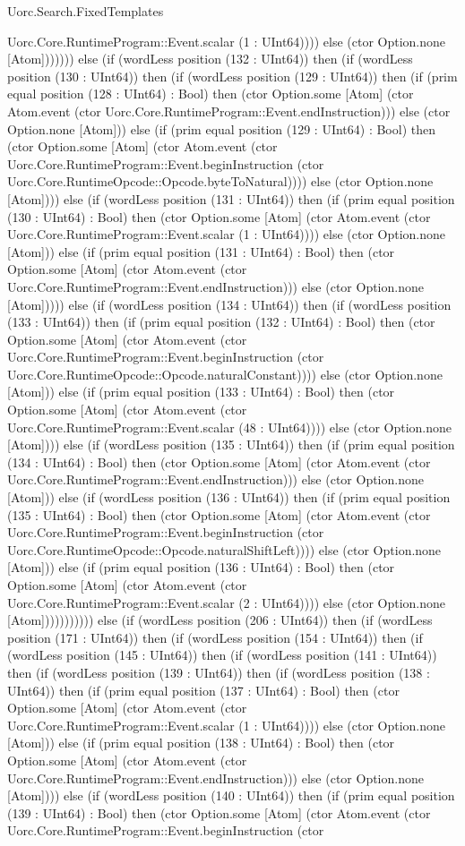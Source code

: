 \begin{lexlean}{Uorc.Search.FixedTemplates}
\begin{semanticmodule}
{Uorc.Core.RuntimeProgram::Event.scalar (1 : UInt64)))) else (ctor Option.none [Atom])))))) else (if (wordLess position (132 : UInt64)) then (if (wordLess position (130 : UInt64)) then (if (wordLess position (129 : UInt64)) then (if (prim equal position (128 : UInt64) : Bool) then (ctor Option.some [Atom] (ctor Atom.event (ctor Uorc.Core.RuntimeProgram::Event.endInstruction))) else (ctor Option.none [Atom])) else (if (prim equal position (129 : UInt64) : Bool) then (ctor Option.some [Atom] (ctor Atom.event (ctor Uorc.Core.RuntimeProgram::Event.beginInstruction (ctor Uorc.Core.RuntimeOpcode::Opcode.byteToNatural)))) else (ctor Option.none [Atom]))) else (if (wordLess position (131 : UInt64)) then (if (prim equal position (130 : UInt64) : Bool) then (ctor Option.some [Atom] (ctor Atom.event (ctor Uorc.Core.RuntimeProgram::Event.scalar (1 : UInt64)))) else (ctor Option.none [Atom])) else (if (prim equal position (131 : UInt64) : Bool) then (ctor Option.some [Atom] (ctor Atom.event (ctor Uorc.Core.RuntimeProgram::Event.endInstruction))) else (ctor Option.none [Atom])))) else (if (wordLess position (134 : UInt64)) then (if (wordLess position (133 : UInt64)) then (if (prim equal position (132 : UInt64) : Bool) then (ctor Option.some [Atom] (ctor Atom.event (ctor Uorc.Core.RuntimeProgram::Event.beginInstruction (ctor Uorc.Core.RuntimeOpcode::Opcode.naturalConstant)))) else (ctor Option.none [Atom])) else (if (prim equal position (133 : UInt64) : Bool) then (ctor Option.some [Atom] (ctor Atom.event (ctor Uorc.Core.RuntimeProgram::Event.scalar (48 : UInt64)))) else (ctor Option.none [Atom]))) else (if (wordLess position (135 : UInt64)) then (if (prim equal position (134 : UInt64) : Bool) then (ctor Option.some [Atom] (ctor Atom.event (ctor Uorc.Core.RuntimeProgram::Event.endInstruction))) else (ctor Option.none [Atom])) else (if (wordLess position (136 : UInt64)) then (if (prim equal position (135 : UInt64) : Bool) then (ctor Option.some [Atom] (ctor Atom.event (ctor Uorc.Core.RuntimeProgram::Event.beginInstruction (ctor Uorc.Core.RuntimeOpcode::Opcode.naturalShiftLeft)))) else (ctor Option.none [Atom])) else (if (prim equal position (136 : UInt64) : Bool) then (ctor Option.some [Atom] (ctor Atom.event (ctor Uorc.Core.RuntimeProgram::Event.scalar (2 : UInt64)))) else (ctor Option.none [Atom])))))))))) else (if (wordLess position (206 : UInt64)) then (if (wordLess position (171 : UInt64)) then (if (wordLess position (154 : UInt64)) then (if (wordLess position (145 : UInt64)) then (if (wordLess position (141 : UInt64)) then (if (wordLess position (139 : UInt64)) then (if (wordLess position (138 : UInt64)) then (if (prim equal position (137 : UInt64) : Bool) then (ctor Option.some [Atom] (ctor Atom.event (ctor Uorc.Core.RuntimeProgram::Event.scalar (1 : UInt64)))) else (ctor Option.none [Atom])) else (if (prim equal position (138 : UInt64) : Bool) then (ctor Option.some [Atom] (ctor Atom.event (ctor Uorc.Core.RuntimeProgram::Event.endInstruction))) else (ctor Option.none [Atom]))) else (if (wordLess position (140 : UInt64)) then (if (prim equal position (139 : UInt64) : Bool) then (ctor Option.some [Atom] (ctor Atom.event (ctor Uorc.Core.RuntimeProgram::Event.beginInstruction (ctor }
\end{semanticmodule}
\end{lexlean}
